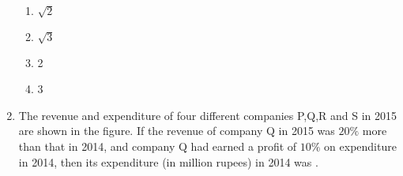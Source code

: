 \documentclass[journal]{IEEEtran}
\begin{document}
\begin{enumerate}
\begin{figure}[H]
    \centering
    
\end{figure}
\begin{enumerate}
    \item $\sqrt{2}$
    \item $\sqrt{3}$
    \item 2
    \item 3
\end{enumerate}
\item The revenue and expenditure of four different companies P,Q,R and S in 2015 are shown in the figure. If the revenue of company Q in 2015 was $20\%$ more than that in 2014, and company Q had earned a profit of $10\%$ on expenditure in 2014, then its expenditure (in million rupees) in 2014 was \underline{\hspace{1cm}}.

    


\end{enumerate}
\end{document}
